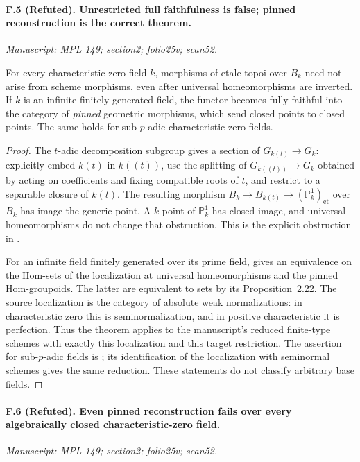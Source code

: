 \paragraph{F.5 (Refuted). Unrestricted
full faithfulness is false; pinned reconstruction is the correct theorem.}
\textit{Manuscript: MPL 149; section2; folio25v; scan52.}

For every characteristic-zero field $k$, morphisms of etale topoi over
$B_k$ need not arise from scheme morphisms, even after universal
homeomorphisms are inverted. If $k$ is an infinite finitely generated
field, the functor becomes fully faithful into the category of
\emph{pinned} geometric morphisms, which send closed points to closed
points. The same holds for sub-$p$-adic characteristic-zero fields.

\begin{proof}
The $t$-adic decomposition subgroup gives a section of
$G_{k(t)}\to G_k$: explicitly embed $k(t)$ in $k((t))$, use the splitting
of $G_{k((t))}\to G_k$ obtained by acting on coefficients and fixing
compatible roots of $t$, and restrict to a separable closure of $k(t)$.
The resulting morphism $B_k\to B_{k(t)}\to(\mathbb P^1_k)_{\mathrm{et}}$
over $B_k$ has image the generic point. A $k$-point of $\mathbb P^1_k$
has closed image, and universal homeomorphisms do not change that
obstruction. This is the explicit obstruction in
\cite[Example~2.30]{CHW2024}.

For an infinite field finitely generated over its prime field,
\cite[Theorem~0.1]{CHW2024} gives an equivalence on the Hom-sets of the
localization at universal homeomorphisms and the pinned Hom-groupoids.
The latter are equivalent to sets by its Proposition~2.22. The source
localization is the category of absolute weak normalizations: in
characteristic zero this is seminormalization, and in positive
characteristic it is perfection. Thus the theorem applies to the
manuscript's reduced finite-type schemes with exactly this localization
and this target restriction. The assertion for sub-$p$-adic fields is
\cite[Theorem~A, equivalently Theorem~4.1]{CarlsonStix2024}; its
identification of the localization with seminormal schemes gives the
same reduction. These statements do not classify arbitrary base fields.
\end{proof}

\paragraph{F.6 (Refuted). Even pinned reconstruction fails over every
algebraically closed characteristic-zero field.}
\textit{Manuscript: MPL 149; section2; folio25v; scan52.}


